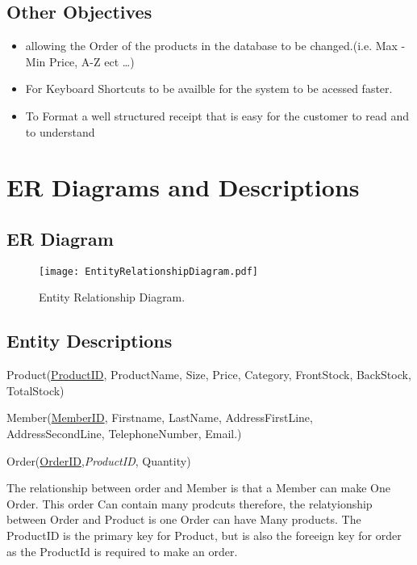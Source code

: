 \subsection{Other Objectives}

\begin{flushleft}
\begin{itemize}
\item allowing the Order of the products in the database to be changed.(i.e. Max - Min Price, A-Z ect \ldots)
\item For Keyboard Shortcuts to be availble for the system to be acessed faster.
\item To Format a well structured receipt that is easy for the customer to read and to understand
\end{itemize}
\end{flushleft}


\section{ER Diagrams and Descriptions}

\subsection{ER Diagram}


\begin{figure}[H]
\texttt{[image: EntityRelationshipDiagram.pdf]}
\caption{Entity Relationship Diagram.} \label{fig:EntityRelationshipDiagram}
\end{figure}

\subsection{Entity Descriptions}


\begin{flushleft}

Product(\underline{ProductID}, ProductName, Size, Price, Category, FrontStock, BackStock, TotalStock)

Member(\underline{MemberID}, Firstname, LastName, AddressFirstLine, AddressSecondLine, TelephoneNumber, Email.)

Order(\underline{OrderID},\textit{ProductID}, Quantity)

The relationship between order and Member is that a Member can make One Order. This order Can contain many prodcuts therefore, the relatyionship between Order and Product is one Order can have Many products. The ProductID is the primary key for Product, but is also the foreeign key for order as the ProductId is required to make an order.

\end{flushleft}

